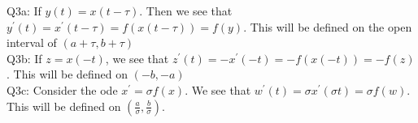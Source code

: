 \documentclass[letterpaper]{article}
\begin{document}
\noindent Q3a: If $y(t)=x(t-\tau)$. Then we see that $y^\prime(t) = x^\prime(t-\tau) = f(x(t-\tau)) = f(y)$. This will be defined on the open interval of $(a+\tau, b+\tau)$
\newline \\ Q3b: If $z = x(-t)$, we see that $z^\prime(t) = -x^\prime(-t) = -f(x(-t)) =-f(z)$. This will be defined on $(-b,-a)$
\newline \\ Q3c: Consider the ode $x^\prime = \sigma f(x)$. We see that $w^\prime(t) = \sigma x^\prime(\sigma t) =\sigma f(w)$. This will be defined on $(\frac{a}{\sigma},\frac{b}{\sigma})$. 
\end{document}
